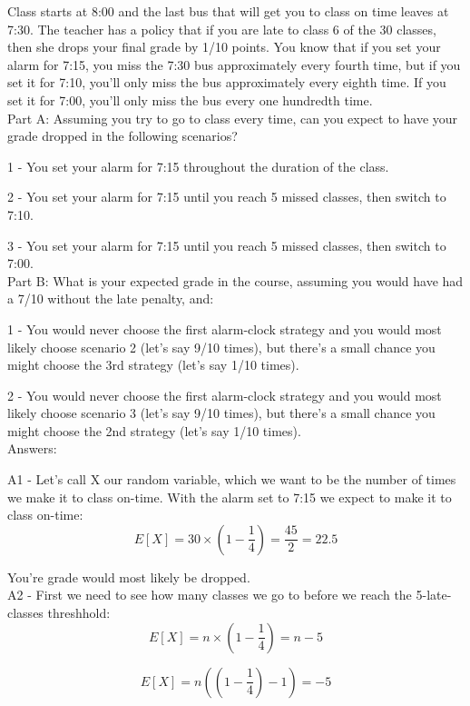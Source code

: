 \documentclass[12pt,a4paper]{article}
\theoremstyle{regla}
\theoremstyle{remark}
\theoremstyle{definition}
\theoremstyle{nonumberbreak}
\begin{document}
\begin{xmpl}

Class starts at 8:00 and the last bus that will get you to class on time leaves at 7:30. The teacher has a policy that if you are late to class 6 of the 30 classes, then she drops your final grade by 1/10 points. You know that if you set your alarm for 7:15, you miss the 7:30 bus approximately every fourth time, but if you set it for 7:10, you'll only miss the bus approximately every eighth time. If you set it for 7:00, you'll only miss the bus every one hundredth time.\\

Part A: Assuming you try to go to class every time, can you expect to have your grade dropped in the following scenarios?

1 - You set your alarm for 7:15 throughout the duration of the class.

2 - You set your alarm for 7:15 until you reach 5 missed classes, then switch to 7:10.

3 - You set your alarm for 7:15 until you reach 5 missed classes, then switch to 7:00.\\

Part B: What is your expected grade in the course, assuming you would have had a 7/10 without the late penalty, and:

1 - You would never choose the first alarm-clock strategy and you would most likely choose scenario 2 (let's say 9/10 times), but there's a small chance you might choose the 3rd strategy (let's say 1/10 times).

2 - You would never choose the first alarm-clock strategy and you would most likely choose scenario 3 (let's say 9/10 times), but there's a small chance you might choose the 2nd strategy (let's say 1/10 times).\\

Answers:

A1 - Let's call X our random variable, which we want to be the number of times we make it to class on-time. With the alarm set to 7:15 we expect to make it to class on-time:
$$E[X]=30\times(1-\frac{1}{4})=\frac{45}{2}=22.5 $$

You're grade would most likely be dropped.\\

A2 - First we need to see how many classes we go to before we reach the 5-late-classes threshhold:
$$E[X] = n \times (1 - \frac{1}{4}) = n - 5 $$

$$E[X] = n ((1 - \frac{1}{4}) - 1) = - 5 $$


\end{xmpl}
\end{document}
